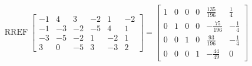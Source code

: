 \begin{exerciseAnswer} 


\[\operatorname{RREF} \left[\begin{array}{cccccc}
-1 & 4 & 3 & -2 & 1 & -2 \\
-1 & -3 & -2 & -5 & 4 & 1 \\
-3 & -5 & -2 & 1 & -2 & 1 \\
3 & 0 & -5 & 3 & -3 & 2
\end{array}\right] = \left[\begin{array}{cccccc}
1 & 0 & 0 & 0 & \frac{135}{196} & \frac{1}{4} \\
0 & 1 & 0 & 0 & -\frac{75}{196} & -\frac{1}{4} \\
0 & 0 & 1 & 0 & \frac{93}{196} & -\frac{1}{4} \\
0 & 0 & 0 & 1 & -\frac{44}{49} & 0
\end{array}\right] \]



\end{exerciseAnswer}
